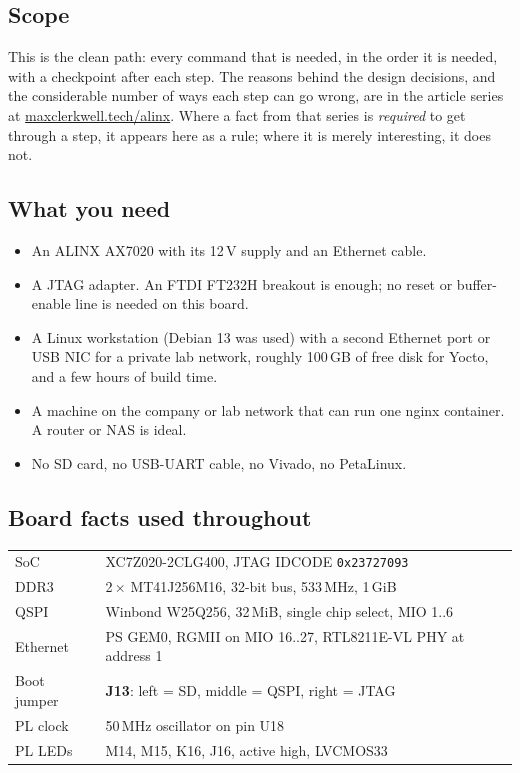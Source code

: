 \documentclass[11pt,a4paper,oneside]{article}
\newcommand{\cmd}[1]{\texttt{#1}}
\newcommand{\series}{\href{https://maxclerkwell.tech/alinx/}{maxclerkwell.tech/alinx}}
\begin{document}
\subsection{Scope}

This is the clean path: every command that is needed, in the order it is
needed, with a checkpoint after each step. The reasons behind the design
decisions, and the considerable number of ways each step can go wrong, are
in the article series at \series. Where a fact from that series is
\emph{required} to get through a step, it appears here as a rule; where it is
merely interesting, it does not.

\subsection{What you need}

\begin{itemize}
  \item An ALINX AX7020 with its 12\,V supply and an Ethernet cable.
  \item A JTAG adapter. An FTDI FT232H breakout is enough; no reset or
        buffer-enable line is needed on this board.
  \item A Linux workstation (Debian 13 was used) with a second Ethernet port
        or USB NIC for a private lab network, roughly 100\,GB of free disk for
        Yocto, and a few hours of build time.
  \item A machine on the company or lab network that can run one nginx
        container. A router or NAS is ideal.
  \item No SD card, no USB-UART cable, no Vivado, no PetaLinux.
\end{itemize}

\subsection{Board facts used throughout}

\begin{center}\small
\begin{tabular}{@{}ll@{}}
\toprule
SoC & XC7Z020-2CLG400, JTAG IDCODE \cmd{0x23727093} \\
DDR3 & 2\,$\times$ MT41J256M16, 32-bit bus, 533\,MHz, 1\,GiB \\
QSPI & Winbond W25Q256, 32\,MiB, single chip select, MIO 1..6 \\
Ethernet & PS GEM0, RGMII on MIO 16..27, RTL8211E-VL PHY at address 1 \\
Boot jumper & \textbf{J13}: left = SD, middle = QSPI, right = JTAG \\
PL clock & 50\,MHz oscillator on pin U18 \\
PL LEDs & M14, M15, K16, J16, active high, LVCMOS33 \\
\bottomrule
\end{tabular}
\end{center}
\end{document}
